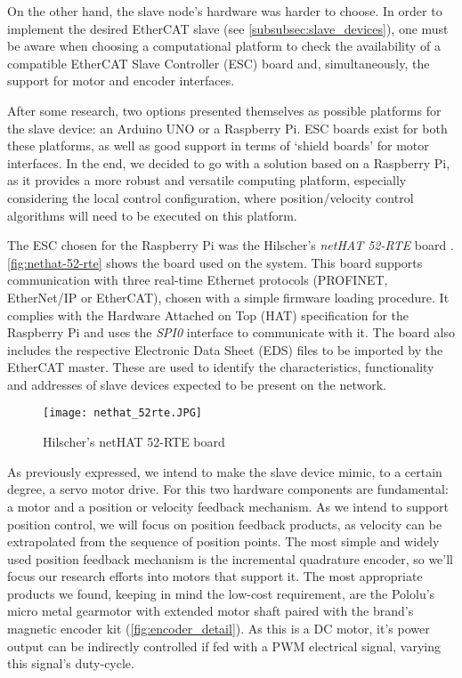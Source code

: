On the other hand, the slave node's hardware was harder to choose.
In order to implement the desired EtherCAT slave (see \autoref{subsubsec:slave_devices}), one must be aware when choosing a computational platform to check the availability of a compatible EtherCAT Slave Controller (ESC) board and, simultaneously, the support for motor and encoder interfaces.

After some research, two options presented themselves as possible platforms for the slave device: an Arduino UNO or a Raspberry Pi.
ESC boards exist for both these platforms, as well as good support in terms of `shield boards' for motor interfaces.
In the end, we decided to go with a solution based on a Raspberry Pi, as it provides a more robust and versatile computing platform, especially considering the local control configuration, where position/velocity control algorithms will need to be executed on this platform.

The ESC chosen for the Raspberry Pi was the Hilscher's \emph{netHAT 52-RTE} board \cite{hdw:nethat-52rte}.
\autoref{fig:nethat-52-rte} shows the board used on the system.
This board supports communication with three real-time Ethernet protocols (PROFINET, EtherNet/IP or EtherCAT), chosen with a simple firmware loading procedure.
It complies with the Hardware Attached on Top (HAT) specification for the Raspberry Pi \cite{technology:hats} and uses the \emph{SPI0} interface to communicate with it.
The board also includes the respective Electronic Data Sheet (EDS) files to be imported by the EtherCAT master.
These are used to identify the characteristics, functionality and addresses of slave devices expected to be present on the network.

\begin{figure}[htp]
	\centering
	\texttt{[image: nethat\_52rte.JPG]}
	\caption{Hilscher's netHAT 52-RTE board}
	\label{fig:nethat-52-rte}
\end{figure}

As previously expressed, we intend to make the slave device mimic, to a certain degree, a servo motor drive.
For this two hardware components are fundamental: a motor and a position or velocity feedback mechanism.
As we intend to support position control, we will focus on position feedback products, as velocity can be extrapolated from the sequence of position points.
The most simple and widely used position feedback mechanism is the incremental quadrature encoder, so we'll focus our research efforts into motors that support it.
The most appropriate products we found, keeping in mind the low-cost requirement, are the Pololu's micro metal gearmotor with extended motor shaft \cite{product:pololu-micrometal-gearmotor} paired with the brand's magnetic encoder kit \cite{product:pololu-encoder-kit} (\autoref{fig:encoder_detail}).
As this is a DC motor, it's power output can be indirectly controlled if fed with a PWM electrical signal, varying this signal's duty-cycle. %

